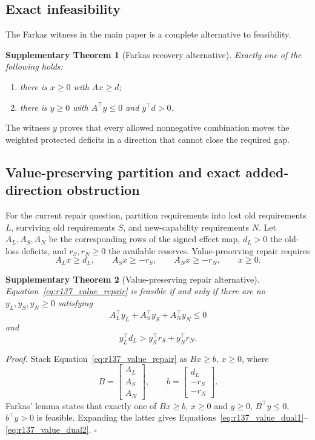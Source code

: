 \documentclass[11pt,letterpaper]{article}
\theoremstyle{plain}
\newtheorem{theorem}{Supplementary Theorem}
\newcommand{\1}{\mathbf 1}
\begin{document}
\subsection{Exact infeasibility}
The Farkas witness in the main paper is a complete alternative to feasibility.
\begin{theorem}[Farkas recovery alternative]
Exactly one of the following holds:
\begin{enumerate}
\item there is $x\ge0$ with $Ax\ge d$;
\item there is $y\ge0$ with $A^\top y\le0$ and $y^\top d>0$.
\end{enumerate}
\end{theorem}
The witness $y$ proves that every allowed nonnegative combination moves the weighted protected deficits in a direction that cannot close the required gap.

\subsection{Value-preserving partition and exact added-direction obstruction}
For the current repair question, partition requirements into lost old requirements $L$, surviving old requirements $S$, and new-capability requirements $N$. Let $A_L,A_S,A_N$ be the corresponding rows of the signed effect map, $d_L>0$ the old-loss deficits, and $r_S,r_N\ge0$ the available reserves. Value-preserving repair requires
\begin{equation}
 A_Lx\ge d_L,\qquad A_Sx\ge-r_S,\qquad A_Nx\ge-r_N,\qquad x\ge0.
\label{eq:r137_value_repair}
\end{equation}

\begin{theorem}[Value-preserving repair alternative]
Equation~\ref{eq:r137_value_repair} is feasible if and only if there are no $y_L,y_S,y_N\ge0$ satisfying
\begin{equation}
 A_L^\top y_L+A_S^\top y_S+A_N^\top y_N\le0
\label{eq:r137_value_dual1}
\end{equation}
and
\begin{equation}
 y_L^\top d_L>y_S^\top r_S+y_N^\top r_N.
\label{eq:r137_value_dual2}
\end{equation}
\end{theorem}
\textit{Proof.} Stack Equation~\ref{eq:r137_value_repair} as $Bx\ge b$, $x\ge0$, where
\begin{equation}
 B=\begin{bmatrix}A_L\\A_S\\A_N\end{bmatrix},\qquad
 b=\begin{bmatrix}d_L\\-r_S\\-r_N\end{bmatrix}.
\label{eq:r137_value_stack}
\end{equation}
Farkas' lemma states that exactly one of $Bx\ge b$, $x\ge0$ and $y\ge0$, $B^\top y\le0$, $b^\top y>0$ is feasible. Expanding the latter gives Equations~\ref{eq:r137_value_dual1}--\ref{eq:r137_value_dual2}. $\square$
\end{document}
